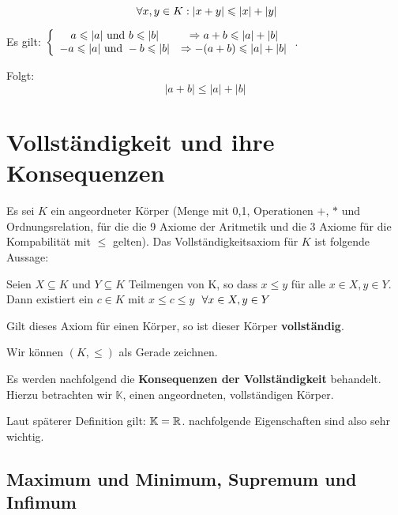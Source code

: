 \documentclass[main.tex]{subfiles}
\begin{document}
\begin{Theorem}[Dreiecksungleichung ($\R$)]
  $$\A x,y\in K : |x+y| \leq |x| + |y|$$
\end{Theorem}

\begin{Beweis}
  Es gilt: $\left\{ \begin{array}{c c}
    a \leq |a| \text{ und } b \leq |b| & \Rightarrow a + b \leq |a| + |b|\\
    -a \leq |a| \text{ und } -b \leq |b| & \Rightarrow -(a + b) \leq |a| + |b|
  \end{array}\right.$.

  Folgt:
  $$|a+b| \leq |a| + |b|$$
\end{Beweis}



\section{Vollständigkeit und ihre Konsequenzen}

\begin{Definition}
  Es sei $K$ ein angeordneter Körper (Menge mit 0,1, Operationen $+$, $*$ und Ordnungsrelation, für die die 9 Axiome der Aritmetik und die 3 Axiome für die Kompabilität mit $\leq$ gelten). Das Vollständigkeitsaxiom für $K$ ist folgende Aussage:
  \begin{Theorem}[Vollständigkeitsaxiom ($V$)]
    Seien $X \subseteq K$ und $Y\subseteq K$ Teilmengen von K, so dass $x\leq y$ für alle $x\in X, y\in Y$. Dann existiert ein $c\in K$ mit $x\leq c \leq y$ $\A x \in X, y \in Y$
  \end{Theorem}
  Gilt dieses Axiom für einen Körper, so ist dieser Körper \textbf{vollständig}.
\end{Definition}

\begin{Bemerkung}
  Wir können $(K, \leq)$ als Gerade zeichnen.
\end{Bemerkung}

Es werden nachfolgend die \textbf{Konsequenzen der Vollständigkeit} behandelt. Hierzu betrachten wir $\mathbb{K}$, einen angeordneten, vollständigen Körper.

\begin{Bemerkung}[Spoiler]
  Laut späterer Definition gilt: $\mathbb{K} = \R$. nachfolgende Eigenschaften sind also sehr wichtig.
\end{Bemerkung}

\subsection{Maximum und Minimum, Supremum und Infimum}
\end{document}
